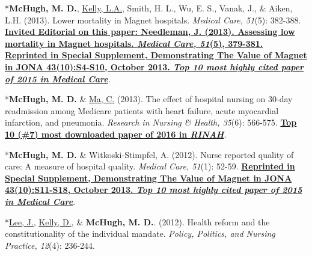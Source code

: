 \documentclass[10pt,]{article}
\begin{document}
{{{{{{{{{{{{{{\vspace{4mm}

\begin{hangparas}{.25in}{1}

*{\textbf {McHugh, M. D.}}, {\underline {Kelly, L.A.}}, Smith, H. L., Wu, E. S., Vanak, J., \& Aiken, L.H. (2013). Lower mortality in Magnet hospitals. {\textit {Medical Care, 51}}(5): 382-388. {\textbf {\underline {Invited Editorial on this paper: Needleman, J. (2013). Assessing low mortality in Magnet hospitals. {\textit {Medical Care, 51}}(5), 379-381. Reprinted in Special Supplement, Demonstrating The Value of Magnet in JONA 43(10):S4-S10, October 2013. {\textit {Top 10 most highly cited paper of 2015 in Medical Care}}}}}.

\end{hangparas}

\vspace{4mm}

\begin{hangparas}{.25in}{1}

*{\textbf {McHugh, M. D.}} \& {\underline {Ma, C.}} (2013). The effect of hospital nursing on 30-day readmission among Medicare patients with heart failure, acute myocardial infarction, and pneumonia. {\textit {Research in Nursing \& Health, 35}}(6): 566-575. {\textbf {\underline {Top 10 (\#7) most downloaded paper of 2016 in {\textit {RINAH}}}}}.

\end{hangparas}

\vspace{4mm}

\begin{hangparas}{.25in}{1}

*{\textbf {McHugh, M. D.}} \& Witkoski-Stimpfel, A. (2012). Nurse reported quality of care: A measure of hospital quality. {\textit {Medical Care, 51}}(1): 52-59. {\textbf {\underline {Reprinted in Special Supplement, Demonstrating The Value of Magnet in JONA 43(10):S11-S18, October 2013. {\textit {Top 10 most highly cited paper of 2015 in Medical Care}}}}}.

\end{hangparas}

\vspace{4mm}

\begin{hangparas}{.25in}{1}

*{\underline {Lee, J.}}, {\underline {Kelly, D.}}, \& {\textbf {McHugh, M. D.}}. (2012). Health reform and the constitutionality of the individual mandate. {\textit {Policy, Politics, and Nursing Practice, 12}}(4): 236-244.


\end{hangparas}}}}}}}}}}}}}}}
\end{document}
